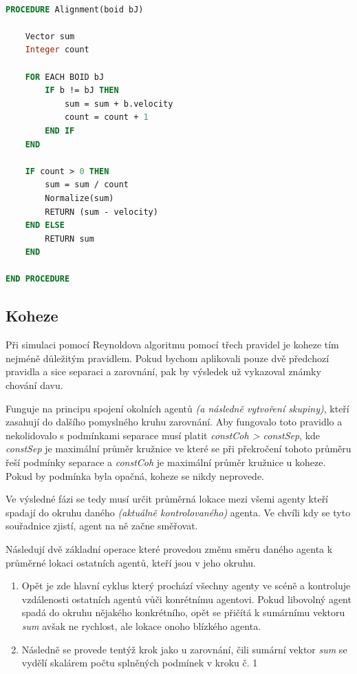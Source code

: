 \documentclass[czech,public,dept460,male,cpdeclaration]{diploma}
\begin{document}
\begin{lstlisting}[language=pascal,label=src:Alignment pseudocode,caption=Pseudokód pro zarovnání]

PROCEDURE Alignment(boid bJ)

	Vector sum
	Integer count
	
	FOR EACH BOID bJ
		IF b != bJ THEN
			sum = sum + b.velocity
			count = count + 1
		END IF
	END
	
	IF count > 0 THEN
		sum = sum / count
		Normalize(sum)
		RETURN (sum - velocity)
	END ELSE
		RETURN sum
	END

END PROCEDURE

\end{lstlisting}

\subsection{Koheze}
Při simulaci pomocí Reynoldova algoritmu pomocí třech pravidel je koheze tím nejméně důležitým pravidlem. Pokud bychom aplikovali pouze dvě předchozí pravidla a sice separaci a zarovnání, pak by výsledek už vykazoval známky chování davu.

Funguje na principu spojení okolních agentů \textit{(a následně vytvoření skupiny)}, kteří zasahují do dalšího pomyslného kruhu zarovnání. Aby fungovalo toto pravidlo a nekolidovalo s podmínkami separace musí platit \textit{constCoh > constSep}, kde \textit{constSep} je maximální průměr kružnice ve které se při překročení tohoto průměru řeší podmínky separace a \textit{constCoh} je maximální průměr kružnice u koheze. Pokud by podmínka byla opačná, koheze se nikdy neprovede.

Ve výsledné fázi se tedy musí určit průměrná lokace mezi všemi agenty kteří spadají do okruhu daného \textit{(aktuálně kontrolovaného)} agenta. Ve chvíli kdy se tyto souřadnice zjistí, agent na ně začne směřovat.

Následují dvě základní operace které provedou změnu směru daného agenta k průměrné lokaci ostatních agentů, kteří jsou v jeho okruhu.

\begin{enumerate}
	\item Opět je zde hlavní cyklus který prochází všechny agenty ve scéně a kontroluje vzdálenosti ostatních agentů vůči konrétnímu agentovi. Pokud libovolný agent spadá do okruhu nějakého konkrétního, opět se přičítá k sumárnímu vektoru \textit{sum} avšak ne rychlost, ale lokace onoho blízkého agenta.
	\item Následně se provede tentýž krok jako u zarovnání, čili sumární vektor \textit{sum} se vydělí skalárem počtu splněných podmínek v kroku č. 1
	
\end{enumerate}
\end{document}
